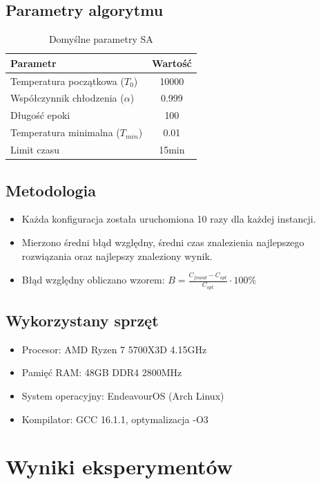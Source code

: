 \documentclass[a4paper,12pt]{article}
\begin{document}
\subsection{Parametry algorytmu}

\begin{table}[H]
\centering
\caption{Domyślne parametry SA}
\begin{tabular}{|l|c|}
\hline
\textbf{Parametr} & \textbf{Wartość} \\
\hline
Temperatura początkowa ($T_0$) & 10000 \\
Współczynnik chłodzenia ($\alpha$) & 0.999 \\
Długość epoki & 100 \\
Temperatura minimalna ($T_{min}$) & 0.01 \\
Limit czasu & 15min \\
\hline
\end{tabular}
\end{table}

\subsection{Metodologia}

\begin{itemize}
    \item Każda konfiguracja została uruchomiona 10 razy dla każdej instancji.
    \item Mierzono średni błąd względny, średni czas znalezienia najlepszego rozwiązania oraz najlepszy znaleziony wynik.
    \item Błąd względny obliczano wzorem: $B = \frac{C_{found} - C_{opt}}{C_{opt}} \cdot 100\%$
\end{itemize}

\subsection{Wykorzystany sprzęt}

\begin{itemize}
    \item Procesor: AMD Ryzen 7 5700X3D 4.15GHz
    \item Pamięć RAM: 48GB DDR4 2800MHz
    \item System operacyjny: EndeavourOS (Arch Linux)
    \item Kompilator: GCC 16.1.1, optymalizacja -O3
\end{itemize}

\section{Wyniki eksperymentów}
\end{document}
